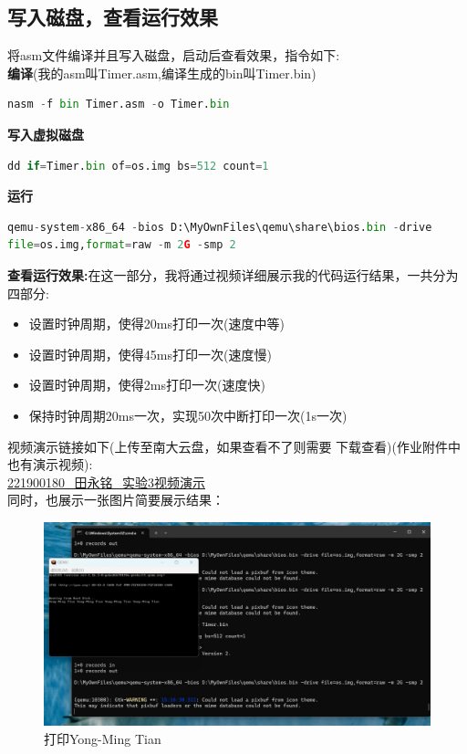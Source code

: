 \documentclass{LabReport}
\begin{document}
	\subsection{写入磁盘，查看运行效果}
	将asm文件编译并且写入磁盘，启动后查看效果，指令如下:\\
	\textbf{编译}(我的asm叫Timer.asm,编译生成的bin叫Timer.bin)
	\begin{lstlisting}[language=python,frame=shadowbox]
nasm -f bin Timer.asm -o Timer.bin
	\end{lstlisting}
	\textbf{写入虚拟磁盘}
	\begin{lstlisting}[language=python,frame=shadowbox]
dd if=Timer.bin of=os.img bs=512 count=1
	\end{lstlisting}
	{\bf 运行}
	\begin{lstlisting}[language=python,frame=shadowbox]
qemu-system-x86_64 -bios D:\MyOwnFiles\qemu\share\bios.bin -drive
file=os.img,format=raw -m 2G -smp 2
	\end{lstlisting}
	\textbf{查看运行效果:}在这一部分，我将通过视频详细展示我的代码运行结果，一共分为四部分:
	\begin{itemize}
		\item 设置时钟周期，使得20ms打印一次(速度中等)
		\item 设置时钟周期，使得45ms打印一次(速度慢)
		\item 设置时钟周期，使得2ms打印一次(速度快)
		\item 保持时钟周期20ms一次，实现50次中断打印一次(1s一次)
	\end{itemize}
	视频演示链接如下(上传至南大云盘，如果查看不了则需要{\color{red} 下载}查看)(作业附件中也有演示视频):\\
	\href{https://box.nju.edu.cn/f/d617483fc46f4cd98a7d/}{\color{red} 221900180\_田永铭\_实验3视频演示}\\
	同时，也展示一张图片简要展示结果：
	
\begin{figure}[h!]
	\centering
	\includegraphics[width=\linewidth]{figures/1}
	\caption{打印Yong-Ming Tian}
	\label{fig:1}
\end{figure}
	
\end{document}

